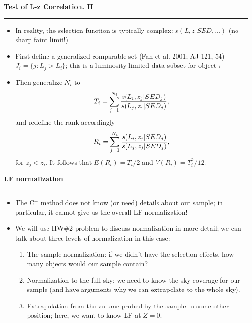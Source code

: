 \documentclass[letterpaper,landscape]{slides}
\begin{document}
\begin{slide}
\begin{center}
\bfseries
{\large {\color{red} Test of L-z Correlation. II}}
\end{center}
\vskip 0.2in
\hrule

\begin{itemize}
\item In reality, the selection function is typically complex:
      $s(L,z|SED, ...)$ (no sharp faint limit!)
\item First define a generalized comparable set (Fan et al. 2001;
      AJ 121, 54)
      $J_i = \{ j:L_j > L_i\}$; this is a luminosity limited data 
      subset for object $i$
\item Then generalize $N_i$ to
\begin{equation}
        T_i = \sum_{j=1}^{N_i} {s(L_i, z_j|SED_j) \over s(L_j, z_j|SED_j)},
\end{equation}
and redefine the rank accordingly
\begin{equation}
        R_i = \sum_{j=1}^{N_i} {s(L_i, z_j|SED_j) \over s(L_j, z_j|SED_j)},
\end{equation}
for $z_j < z_i$. It follows that $E(R_i) = T_i/2$ and $V(R_i) = T_i^2/12$. 

\end{itemize}

\vfill
\end{slide}
 


\begin{slide}
\begin{center}
\bfseries
{\large {\color{red} LF normalization}}
\end{center}
\vskip 0.2in
\hrule

\begin{itemize}
\item The C$^-$ method does not know (or need) details about our sample; in particular, 
     it cannot give us the overall LF normalization! 
\item We will use HW\#2 problem to discuss normalization in more detail; we can talk 
about three levels of normalization in this case:
\begin{enumerate} 
\item {\color{blue} The sample normalization:} if we didn't have the selection effects, how many 
  objects would our sample contain? 
\item {\color{blue} Normalization to the full sky:} we need to know the sky coverage for our 
   sample (and have arguments why we can extrapolate to the whole sky). 
\item {\color{blue} Extrapolation}  from the volume probed by the sample  {\color{blue} to some other position;} 
   here, we want to know LF at $Z=0$. 
\end{enumerate} 
\end{itemize}

\vfill
\end{slide}
 
\end{document}
